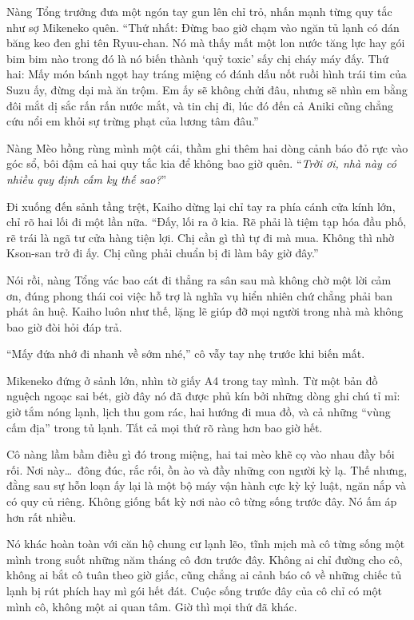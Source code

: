 ﻿\documentclass[../main.tex]{subfiles}
\begin{document}
Nàng Tổng trưởng đưa một ngón tay gun lên chỉ trỏ, nhấn mạnh từng quy tắc như sợ Mikeneko quên. ``Thứ nhất: Đừng bao giờ chạm vào ngăn tủ lạnh có dán băng keo đen ghi tên Ryuu-chan. Nó mà thấy mất một lon nước tăng lực hay gói bim bim nào trong đó là nó biến thành `quỷ toxic' sấy chị cháy máy đấy. Thứ hai: Mấy món bánh ngọt hay tráng miệng có đánh dấu nốt ruồi hình trái tim của Suzu ấy, đừng dại mà ăn trộm. Em ấy sẽ không chửi đâu, nhưng sẽ nhìn em bằng đôi mắt dị sắc rấn rấn nước mắt, và tin chị đi, lúc đó đến cả Aniki cũng chẳng cứu nổi em khỏi sự trừng phạt của lương tâm đâu.''

Nàng Mèo hồng rùng mình một cái, thầm ghi thêm hai dòng cảnh báo đỏ rực vào góc sổ, bôi đậm cả hai quy tắc kia để không bao giờ quên. ``\textit{Trời ơi, nhà này có nhiều quy định cấm kỵ thế sao?}''

Đi xuống đến sảnh tầng trệt, Kaiho dừng lại chỉ tay ra phía cánh cửa kính lớn, chỉ rõ hai lối đi một lần nữa. ``Đấy, lối ra ở kia. Rẽ phải là tiệm tạp hóa đầu phố, rẽ trái là ngã tư cửa hàng tiện lợi. Chị cần gì thì tự đi mà mua. Không thì nhờ Kson-san trở đi ấy. Chị cũng phải chuẩn bị đi làm bây giờ đây.''

Nói rồi, nàng Tổng vác bao cát đi thẳng ra sân sau mà không chờ một lời cảm ơn, đúng phong thái coi việc hỗ trợ là nghĩa vụ hiển nhiên chứ chẳng phải ban phát ân huệ. Kaiho luôn như thế, lặng lẽ giúp đỡ mọi người trong nhà mà không bao giờ đòi hỏi đáp trả.

``Mấy đứa nhớ đi nhanh về sớm nhé,'' cô vẫy tay nhẹ trước khi biến mất.

Mikeneko đứng ở sảnh lớn, nhìn tờ giấy A4 trong tay mình. Từ một bản đồ nguệch ngoạc sai bét, giờ đây nó đã được phủ kín bởi những dòng ghi chú tỉ mỉ: giờ tắm nóng lạnh, lịch thu gom rác, hai hướng đi mua đồ, và cả những ``vùng cấm địa'' trong tủ lạnh. Tất cả mọi thứ rõ ràng hơn bao giờ hết.

Cô nàng lầm bầm điều gì đó trong miệng, hai tai mèo khẽ cọ vào nhau đầy bối rối. Nơi này\dots\ đông đúc, rắc rối, ồn ào và đầy những con người kỳ lạ. Thế nhưng, đằng sau sự hỗn loạn ấy lại là một bộ máy vận hành cực kỳ kỷ luật, ngăn nắp và có quy củ riêng. Không giống bất kỳ nơi nào cô từng sống trước đây. Nó ấm áp hơn rất nhiều.

Nó khác hoàn toàn với căn hộ chung cư lạnh lẽo, tĩnh mịch mà cô từng sống một mình trong suốt những năm tháng cô đơn trước đây. Không ai chỉ đường cho cô, không ai bắt cô tuân theo giờ giấc, cũng chẳng ai cảnh báo cô về những chiếc tủ lạnh bị rút phích hay mì gói hết đát. Cuộc sống trước đây của cô chỉ có một mình cô, không một ai quan tâm. Giờ thì mọi thứ đã khác.
\end{document}

